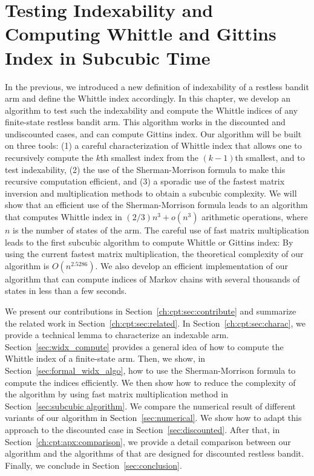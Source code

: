 \begingroup

\let\clearpage\relax

\chapter{Testing Indexability and Computing Whittle and Gittins Index in Subcubic Time}
\label{ch:index_computation}

In the previous, we introduced a new definition of indexability of a restless bandit arm and define the Whittle index accordingly.
In this chapter, we develop an algorithm to test such the indexability and compute the Whittle indices of any finite-state restless bandit arm.
This algorithm works in the discounted and undiscounted cases, and can compute Gittins index.
Our algorithm will be built on three tools: (1) a careful characterization of Whittle index that allows one to recursively compute the $k$th smallest index from the $(k-1)$th smallest, and to test indexability, (2) the use of the Sherman-Morrison formula to make this recursive computation efficient, and (3) a sporadic use of the fastest matrix inversion and multiplication methods to obtain a subcubic complexity.
We will show that an efficient use of the Sherman-Morrison formula leads to an algorithm that computes Whittle index in $(2/3)n^3 + o(n^3)$ arithmetic operations, where $n$ is the number of states of the arm. 
The careful use of fast matrix multiplication leads to the first subcubic algorithm to compute Whittle or Gittins index: By using the current fastest matrix multiplication, the theoretical complexity of our algorithm is $O(n^{2.5286})$.
We also develop an efficient implementation of our algorithm that can compute indices of Markov chains with several thousands of states in less than a few seconds.

We present our contributions in Section~\ref{ch:cpt:sec:contribute} and summarize the related work in Section~\ref{ch:cpt:sec:related}.
In Section~\ref{ch:cpt:sec:charac}, we provide a technical lemma to characterize an indexable arm.
Section~\ref{sec:widx_compute} provides a general idea of how to compute the Whittle index of a finite-state arm.
Then, we show, in Section~\ref{sec:formal_widx_algo}, how to use the Sherman-Morrison formula to compute the indices efficiently. We then show how to reduce the complexity of the algorithm by using fast matrix multiplication method in Section~\ref{sec:subcubic algorithm}. We compare the numerical result of different variants of our algorithm in Section~\ref{sec:numerical}. We show how to adapt this approach to the discounted case in Section~\ref{sec:discounted}.
After that, in Section~\ref{ch:cpt:apx:comparison}, we provide a detail comparison between our algorithm and the algorithms of \cite{nino2020fast, akbarzadeh2020conditions} that are designed for discounted restless bandit.
Finally, we conclude in Section~\ref{sec:conclusion}.

